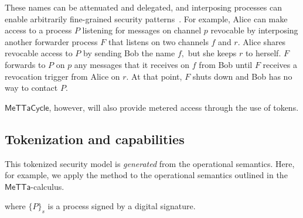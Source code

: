 \documentclass{article}
\newcommand{\MC}{\mathsf{MeTTaCycle}}
\begin{document}
These names can be attenuated and delegated, and interposing processes can enable arbitrarily fine-grained security patterns~\cite{Stiegler2004}.  For example, Alice can make access to a process $P$ listening for messages on channel $p$ revocable by interposing another forwarder process $F$ that listens on two channels $f$ and $r$.  Alice shares revocable access to $P$ by sending Bob the name $f,$ but she keeps $r$ to herself.  $F$ forwards to $P$ on $p$ any messages that it receives on $f$ from Bob until $F$ receives a revocation trigger from Alice on $r$.  At that point, $F$ shuts down and Bob has no way to contact $P$.

$\MC$, however, will also provide metered access through the use of tokens.

\subsection{Tokenization and capabilities}
\label{Security model}

This tokenized security model is \emph{generated} from the operational
semantics. Here, for example, we apply the method to the operational
semantics outlined in the $\mathsf{MeTTa}$-calculus.


where $\mathsf{\{}P\mathsf{\}}_{s}$ is a process signed by a digital signature.

\end{document}

